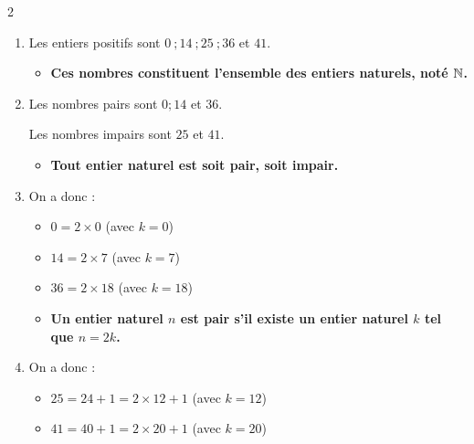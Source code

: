 \documentclass[10pt, a4paper]{article}
\begin{document}
\vspace{0.3cm}

\begin{multicols*}{2}

\begin{Solution}[ACTIVITÉ][1]
\begin{enumerate}[leftmargin=*,itemsep=0.5pt]
    \item Les entiers positifs sont $0 ~; 14 ~; 25 ~; 36$ et $41$.
    \begin{itemize}[label=$\blacktriangleright$, leftmargin=*, nosep]
    \item \textbf{Ces nombres constituent l'ensemble des \textcolor{PrimaryColor}{entiers naturels}, noté $\mathbb{N}$.}
    \end{itemize}

    \item Les nombres pairs sont $0 ; 14$ et $36$.

    Les nombres impairs sont $25$ et $41$.

    \begin{itemize}[label=$\blacktriangleright$, leftmargin=*, nosep]
    \item \textbf{Tout entier naturel est soit \textcolor{PrimaryColor}{pair}, soit \textcolor{PrimaryColor}{impair}.}
    \end{itemize}

    \item On a donc :
    \begin{itemize}[leftmargin=*,itemsep=0.5pt]
        \item $0 = 2 \times 0$ (avec $k=0$)

        \item $14 = 2 \times 7$ (avec $k=7$)

        \item $36 = 2 \times 18$ (avec $k=18$)
    \end{itemize}

    \begin{itemize}[label=$\blacktriangleright$, leftmargin=*, nosep]
    \item \textbf{Un entier naturel $n$ est \textcolor{PrimaryColor}{pair} s'il existe un entier naturel $k$ tel que $n = 2k$.}
    \end{itemize}

    \item On a donc :
    \begin{itemize}[leftmargin=*,itemsep=0.5pt]
        \item $25 = 24 + 1 = 2 \times 12 + 1$ (avec $k=12$)
        \item $41 = 40 + 1 = 2 \times 20 + 1$ (avec $k=20$)
    \end{itemize}


\end{enumerate}
\end{Solution}
\end{multicols*}
\end{document}
